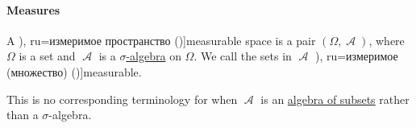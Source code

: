 \paragraph{Measures}

\begin{definition}\label{def:measurable_space}
  A \term[bg=измеримо пространство (\cite[def. 3.6]{Драганов2022ТеорияНаМярката}), ru=измеримое пространство (\cite[def. 1.2.3]{Богачёв2003ОсновыТеорииМерыТом1})]{measurable space} is a pair \( (\Omega, \mscrA) \), where \( \Omega \) is a set and \( \mscrA \) is a \hyperref[def:sigma_algebra]{\( \sigma \)-algebra} on \( \Omega \). We call the sets in \( \mscrA \) \term[bg=измеримо множество (\cite[def. 3.6]{Драганов2022ТеорияНаМярката}), ru=измеримое (множество) (\cite[52]{КанторовичАкилов1984ФункциональныйАнализ})]{measurable}.
\end{definition}
\begin{comments}
  \item This is no corresponding terminology for when \( \mscrA \) is an \hyperref[def:algebra_of_subsets]{algebra of subsets} rather than a \( \sigma \)-algebra.
\end{comments}

